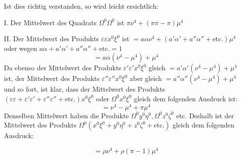 Ist dies richtig verstanden, so wird leicht ersichtlich:

I. Der Mittelwert des Quadrats \(\Omega^0\Omega^0\) ist \(\pi\nu^4+(\pi\pi-\pi)\mu^4\)

II. Der Mittelwert des Produkts \(\varepsilon\varepsilon x^0\xi^0\) ist \(=a\alpha\nu^4+(a'\alpha'+a''\alpha''+\text{etc.})\mu^4\) oder wegen \(a\alpha+a'\alpha'+a''\alpha''+\text{etc.}=1\)
\[
=a\alpha(\nu^4-\mu^4)+\mu^4
\]
Da ebenso der Mittelwert des Produkts \(\varepsilon'\varepsilon'x^0\xi^0\) gleich \(=a'\alpha'(\nu^4-\mu^4)+\mu^4\) ist, der Mittelwert des Produkts \(\varepsilon''\varepsilon''x^0\xi^0\) aber gleich \(=a''\alpha''(\nu^4-\mu^4)+\mu^4\) und so fort, ist klar, dass der Mittelwert des Produkts \((\varepsilon\varepsilon+\varepsilon'\varepsilon'+\varepsilon''\varepsilon''+\text{etc.})x^0\xi^0\) oder \(\Omega^0x^0\xi^0\) gleich dem folgenden Ausdruck ist:
\[
=\nu^4-\mu^4+\pi\mu^4
\]
\begingroup\setlength{\rightskip}{0pt plus 2em}\noindent Denselben Mittelwert haben die Produkte \(\Omega^0y^0\eta^0,\allowbreak\Omega^0z^0\zeta^0\) etc. Deshalb ist der Mittelwert des Produkts \(\Omega^0(x^0\xi^0+y^0\eta^0+z^0\zeta^0+\text{etc.})\) gleich dem folgenden Ausdruck:\par\endgroup
\[
=\rho\nu^4+\rho(\pi-1)\mu^4
\]

